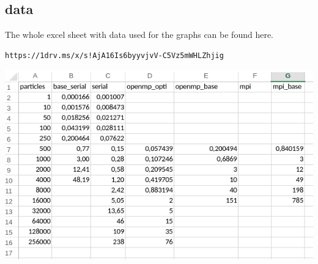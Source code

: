 \documentclass[a4paper,10pt,titlepage]{report}
\begin{document}
\subsection{data}
The whole excel sheet with data used for the graphs can be found here.
\begin{lstlisting}
https://1drv.ms/x/s!AjA16Is6byyvjvV-C5Vz5mWHLZhjig
\end{lstlisting}
\includegraphics[scale=0.7]{alldata}

%

%
\end{document}
